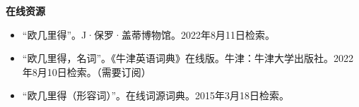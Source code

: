 \textbf{在线资源}  
\begin{itemize}
\item “欧几里得”。J·保罗·盖蒂博物馆。2022年8月11日检索。  
\item “欧几里得，名词”。《牛津英语词典》在线版。牛津：牛津大学出版社。2022年8月10日检索。（需要订阅）  
\item “欧几里得（形容词）”。在线词源词典。2015年3月18日检索。
\end{itemize}